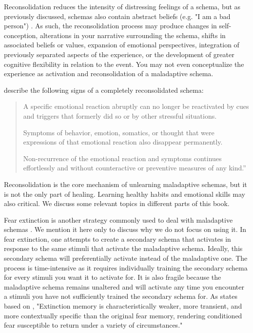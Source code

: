 \documentclass[12pt,letterpaper]{book}
\begin{document}
Reconsolidation reduces the intensity of distressing feelings of a schema, but as previously discussed, schemas also contain abstract beliefs (e.g. "I am a bad person") \cite{laneReconsolidation}. As such, the reconsolidation process may produce changes in self-conception, alterations in your narrative surrounding the schema, shifts in associated beliefs or values, expansion of emotional perspectives, integration of previously separated aspects of the experience, or the development of greater cognitive flexibility in relation to the event. You may not even conceptualize the experience as activation and reconsolidation of a maladaptive schema.

\textcite{eckerUnlocking} describe the following signs of a completely reconsolidated schema:
\begin{quotation}
    A specific emotional reaction abruptly can no longer be reactivated by cues and triggers that formerly did so or by other stressful situations.
    
    Symptoms of behavior, emotion, somatics, or thought that were expressions of that emotional reaction also disappear permanently.
    
    Non-recurrence of the emotional reaction and symptoms continues effortlessly and without counteractive or preventive measures of any kind.”
\end{quotation}

Reconsolidation is the core mechanism of unlearning maladaptive schemas, but it is not the only part of healing. Learning healthy habits and emotional skills may also critical. We discuss some relevant topics in different parts of this book.

Fear extinction is another strategy commonly used to deal with maladaptive schemas \cite{eckerUnlocking}. We mention it here only to discuss why we do not focus on using it. In fear extinction, one attempts to create a secondary schema that activates in response to the same stimuli that activate the maladaptive schema. Ideally, this secondary schema will preferentially activate instead of the maladaptive one. The process is time-intensive as it requires individually training the secondary schema for every stimuli you want it to activate for. It is also fragile because the maladaptive schema remains unaltered and will activate any time you encounter a stimuli you have not sufficiently trained the secondary schema for. As \textcite{doss2024memory} states based on \textcite{dunsmoor2022laboratory}, "Extinction memory is characteristically weaker, more transient, and more contextually specific than the original fear memory, rendering conditioned fear susceptible to return under a variety of circumstances."
\end{document}
